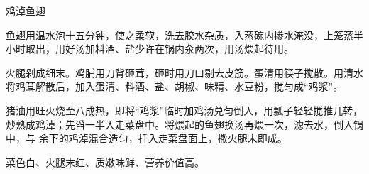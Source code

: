 \begin{recipe}{鸡淖鱼翅}

\ingredients


\preparation

\step 鱼翅用温水泡十五分钟，使之柔软，洗去胶水杂质，入蒸碗内掺水淹没，上笼蒸半
小时取出，用好汤加料酒、盐少许在锅内汆两次，用汤煨起待用。

\step 火腿剁成细末。鸡脯用刀背砸茸，砸时用刀口剔去皮筋。蛋清用筷子搅散。用清水
将鸡茸解散后，加入蛋清、料酒、盐、胡椒、味精、水豆粉，搅匀成“鸡浆”。

\step 猪油用旺火烧至八成热，即将“鸡浆”临时加鸡汤兑匀倒入，用瓢子轻轻搅推几转，
炒熟成鸡淖；先舀一半入走菜盘中。将煨起的鱼翅换汤再煨一次，滤去水，倒入锅中，与
余下的鸡淖混合造匀，扦入走菜盘面上，撒火腿末即成。

\features

菜色白、火腿末红、质嫩味鲜、营养价值高。

\end{recipe}

